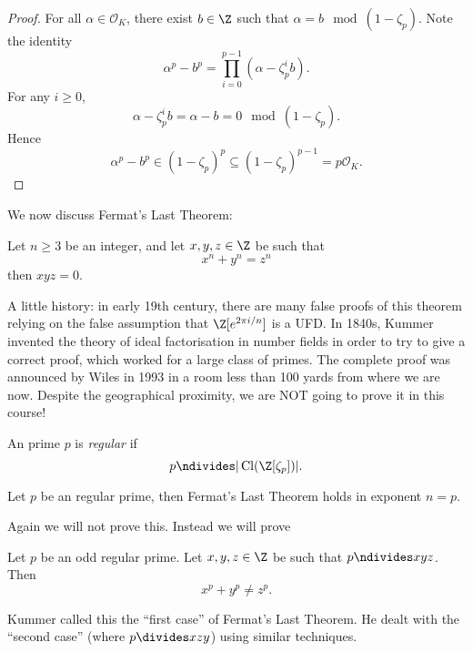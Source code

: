 \documentclass[a4paper]{article}
\renewcommand*{\O}{\mathcal{O}}
\DeclareMathOperator{\Cl}{Cl} %
\begin{document}
\begin{proof}
  For all \(\alpha \in \O_K\), there exist \(b \in \Z\) such that \(\alpha = b \mod{(1 - \zeta_p)}\). Note the identity
  \[
    \alpha^p - b^p = \prod_{i = 0}^{p - 1}(\alpha - \zeta_p^i b).
  \]
  For any \(i \geq 0\),
  \[
    \alpha - \zeta_p^i b = \alpha - b = 0 \mod{(1 - \zeta_p)}.
  \]
  Hence
  \[
    \alpha^p - b^p \in (1 - \zeta_p)^p \subseteq (1 - \zeta_p)^{p - 1} = p\O_K.
  \]
\end{proof}

We now discuss Fermat's Last Theorem:

\begin{theorem}[Wiles, 1994]
  Let \(n \geq 3\) be an integer, and let \(x, y, z \in \Z\) be such that
  \[
    x^n + y^n = z^n
  \]
  then \(xyz = 0\).
\end{theorem}

A little history: in early 19th century, there are many false proofs of this theorem relying on the false assumption that \(\Z[e^{2\pi i/n}]\) is a UFD. In 1840s, Kummer invented the theory of ideal factorisation in number fields in order to try to give a correct proof, which worked for a large class of primes. The complete proof was announced by Wiles in 1993 in a room less than 100 yards from where we are now. Despite the geographical proximity, we are NOT going to prove it in this course!

\begin{definition}
  An prime \(p\) is \emph{regular} if
  \[
    p \ndivides |\Cl(\Z[\zeta_p])|.
  \]
\end{definition}

\begin{theorem}[Kummer]
  Let \(p\) be an regular prime, then Fermat's Last Theorem holds in exponent \(n = p\).
\end{theorem}

Again we will not prove this. Instead we will prove

\begin{theorem}
  Let \(p\) be an odd regular prime. Let \(x, y, z \in \Z\) be such that \(p \ndivides xyz\). Then
  \[
    x^p + y^p \neq z^p.
  \]
\end{theorem}

Kummer called this the ``first case'' of Fermat's Last Theorem. He dealt with the ``second case'' (where \(p \divides xzy\)) using similar techniques.
\end{document}
